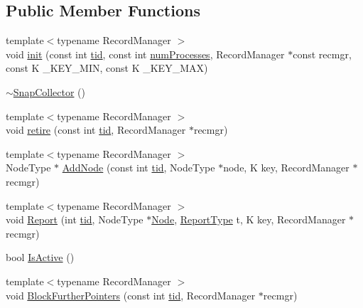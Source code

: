 \subsection*{Public Member Functions}
\begin{DoxyCompactItemize}
\item 
{\footnotesize template$<$typename Record\+Manager $>$ }\\void \hyperlink{classSnapCollector_ab94abbe542a7e33a212e8247b96197b5}{init} (const int \hyperlink{microbench_2main_8cpp_a9ca9869868fe7e7a38a921cc7de4103f}{tid}, const int \hyperlink{testing_8cpp_aa085812188e21ede75351d88b9b2c30d}{num\+Processes}, Record\+Manager $\ast$const recmgr, const K \+\_\+\+K\+E\+Y\+\_\+\+M\+IN, const K \+\_\+\+K\+E\+Y\+\_\+\+M\+AX)
\item 
\hyperlink{classSnapCollector_afe44bffcd16d6f6cd54c313be9703e52}{$\sim$\+Snap\+Collector} ()
\item 
{\footnotesize template$<$typename Record\+Manager $>$ }\\void \hyperlink{classSnapCollector_a9060f1d38be8915ad5e0139bc518bab4}{retire} (const int \hyperlink{microbench_2main_8cpp_a9ca9869868fe7e7a38a921cc7de4103f}{tid}, Record\+Manager $\ast$recmgr)
\item 
{\footnotesize template$<$typename Record\+Manager $>$ }\\Node\+Type $\ast$ \hyperlink{classSnapCollector_aab421d45e780e447bb9b5b872fa368f9}{Add\+Node} (const int \hyperlink{microbench_2main_8cpp_a9ca9869868fe7e7a38a921cc7de4103f}{tid}, Node\+Type $\ast$node, K key, Record\+Manager $\ast$recmgr)
\item 
{\footnotesize template$<$typename Record\+Manager $>$ }\\void \hyperlink{classSnapCollector_a99bf72a5b736cc82ce4c64e0fd76d15e}{Report} (int \hyperlink{microbench_2main_8cpp_a9ca9869868fe7e7a38a921cc7de4103f}{tid}, Node\+Type $\ast$\hyperlink{classNode}{Node}, \hyperlink{reportitem_8h_ae4f179a72db5cca021a37ec4c6fe4c68}{Report\+Type} t, K key, Record\+Manager $\ast$recmgr)
\item 
bool \hyperlink{classSnapCollector_a6140fe1b63009ac107881faaf43c09da}{Is\+Active} ()
\item 
{\footnotesize template$<$typename Record\+Manager $>$ }\\void \hyperlink{classSnapCollector_a53b4976ed927e14a99bb52993ffd5a2b}{Block\+Further\+Pointers} (const int \hyperlink{microbench_2main_8cpp_a9ca9869868fe7e7a38a921cc7de4103f}{tid}, Record\+Manager $\ast$recmgr)
\item 

\end{DoxyCompactItemize}
